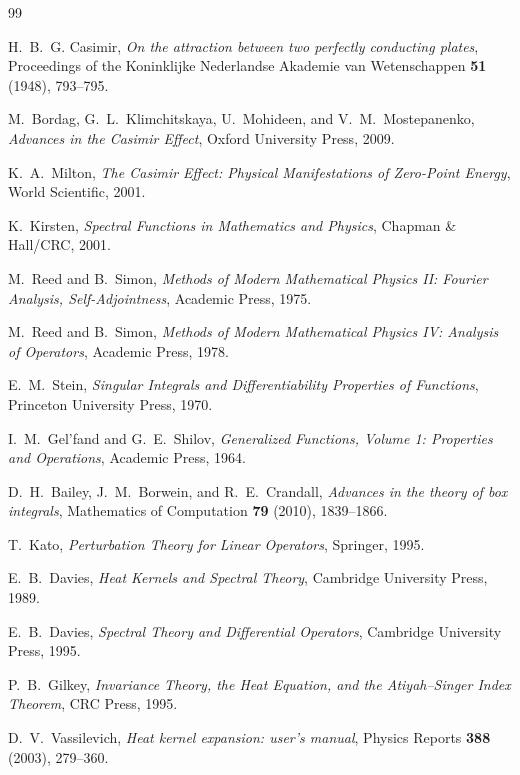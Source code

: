 \documentclass[11pt]{article}
\begin{document}
\begin{thebibliography}{99}

H.~B.~G. Casimir,
\emph{On the attraction between two perfectly conducting plates},
Proceedings of the Koninklijke Nederlandse Akademie van Wetenschappen \textbf{51} (1948), 793--795.

M.~Bordag, G.~L.~Klimchitskaya, U.~Mohideen, and V.~M.~Mostepanenko,
\emph{Advances in the Casimir Effect},
Oxford University Press, 2009.

K.~A.~Milton,
\emph{The Casimir Effect: Physical Manifestations of Zero-Point Energy},
World Scientific, 2001.

K.~Kirsten,
\emph{Spectral Functions in Mathematics and Physics},
Chapman \& Hall/CRC, 2001.

M.~Reed and B.~Simon,
\emph{Methods of Modern Mathematical Physics II: Fourier Analysis, Self-Adjointness},
Academic Press, 1975.

M.~Reed and B.~Simon,
\emph{Methods of Modern Mathematical Physics IV: Analysis of Operators},
Academic Press, 1978.

E.~M.~Stein,
\emph{Singular Integrals and Differentiability Properties of Functions},
Princeton University Press, 1970.

I.~M.~Gel'fand and G.~E.~Shilov,
\emph{Generalized Functions, Volume 1: Properties and Operations},
Academic Press, 1964.

D.~H.~Bailey, J.~M.~Borwein, and R.~E.~Crandall,
\emph{Advances in the theory of box integrals},
Mathematics of Computation \textbf{79} (2010), 1839--1866.

T.~Kato,
\emph{Perturbation Theory for Linear Operators},
Springer, 1995.

E.~B.~Davies,
\emph{Heat Kernels and Spectral Theory},
Cambridge University Press, 1989.

E.~B.~Davies,
\emph{Spectral Theory and Differential Operators},
Cambridge University Press, 1995.

P.~B.~Gilkey,
\emph{Invariance Theory, the Heat Equation, and the Atiyah--Singer Index Theorem},
CRC Press, 1995.

D.~V.~Vassilevich,
\emph{Heat kernel expansion: user's manual},
Physics Reports \textbf{388} (2003), 279--360.


\end{thebibliography}
\end{document}
